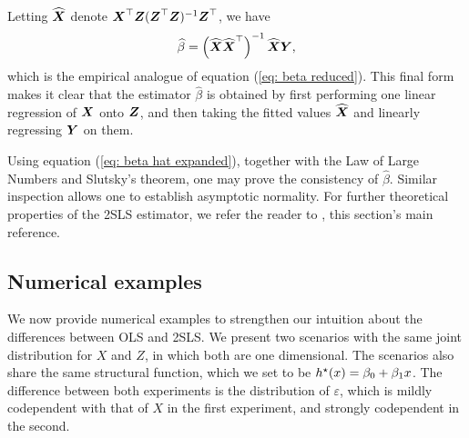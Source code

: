 Letting $ \widehat{ \boldsymbol X } $ denote $ \boldsymbol X^{ \top } \boldsymbol Z ( \boldsymbol Z^{ \top } \boldsymbol Z )^{ -1 } \boldsymbol Z^{ \top } $, we have
\begin{equation*}
    \widehat{ \beta } = \left( \widehat{ \boldsymbol X } \widehat{ \boldsymbol X }^{ \top } \right)^{ -1 } \widehat{ \boldsymbol X } \boldsymbol Y 
,\end{equation*}
which is the empirical analogue of equation (\ref{eq: beta reduced}).
This final form makes it clear that the estimator $ \hat{ \beta } $ is obtained by first performing one linear regression of $ \boldsymbol X $ onto $ \boldsymbol Z $, and then taking the fitted values $ \widehat{ \boldsymbol X } $ and linearly regressing $ \boldsymbol Y $ on them.

Using equation (\ref{eq: beta hat expanded}), together with the Law of Large Numbers and Slutsky's theorem, one may prove the consistency of $ \hat{ \beta } $.
Similar inspection allows one to establish asymptotic normality.
For further theoretical properties of the 2SLS estimator, we refer the reader to \cite[Chapter~5]{wooldridge2001}, this section's main reference.

\subsection{Numerical examples}

We now provide numerical examples to strengthen our intuition about the differences between OLS and 2SLS.
We present two scenarios with the same joint distribution for $ X $ and $ Z $, in which both are one dimensional.
The scenarios also share the same structural function, which we set to be $ h^{ \star } ( x ) = \beta_{ 0 } + \beta_{ 1 }x $.
The difference between both experiments is the distribution of $ \varepsilon $, which is mildly codependent with that of $ X $ in the first experiment, and strongly codependent in the second.

